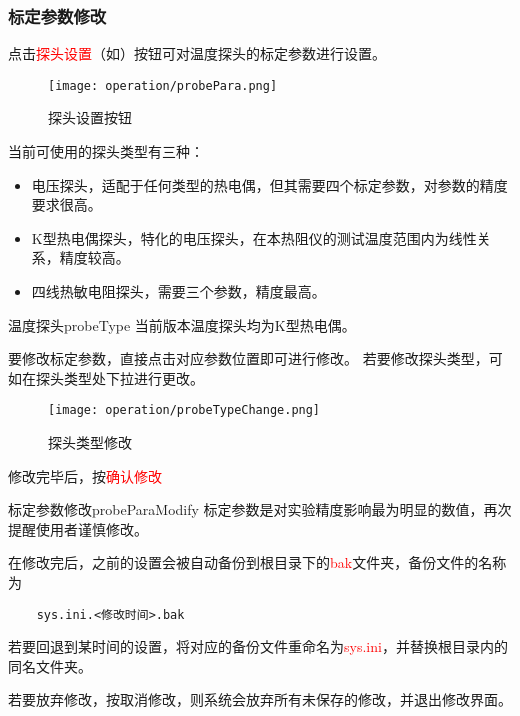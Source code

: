 \subsubsection*{标定参数修改}
点击\textcolor{red}{探头设置}（如）按钮可对温度探头的标定参数进行设置。
\begin{figure}[H]
    \centering
    \texttt{[image: operation/probePara.png]}
    \caption{  探头设置按钮 \label{fig:btnProbePara}}
\end{figure}
当前可使用的探头类型有三种：
\begin{itemize}
    \item 电压探头，适配于任何类型的热电偶，但其需要四个标定参数，对参数的精度要求很高。
    \item K型热电偶探头，特化的电压探头，在本热阻仪的测试温度范围内为线性关系，精度较高。
    \item 四线热敏电阻探头，需要三个参数，精度最高。
\end{itemize}
\begin{tips}{温度探头}{probeType}
    当前版本温度探头均为K型热电偶。
\end{tips}
要修改标定参数，直接点击对应参数位置即可进行修改。
若要修改探头类型，可如在探头类型处下拉进行更改。
\begin{figure}[H]
    \centering
    \texttt{[image: operation/probeTypeChange.png]}
    \caption{  探头类型修改 \label{fig:probeTypeChange}}
\end{figure}
修改完毕后，按\textcolor{red}{确认修改}
\begin{tips}{标定参数修改}{probeParaModify}
    标定参数是对实验精度影响最为明显的数值，再次提醒使用者谨慎修改。
\end{tips}
在修改完后，之前的设置会被自动备份到根目录下的\textcolor{red}{bak}文件夹，备份文件的名称为
\begin{lstlisting}
    sys.ini.<修改时间>.bak
\end{lstlisting}
若要回退到某时间的设置，将对应的备份文件重命名为\textcolor{red}{sys.ini}，并替换根目录内的同名文件夹。
\par 若要放弃修改，按取消修改，则系统会放弃所有未保存的修改，并退出修改界面。
